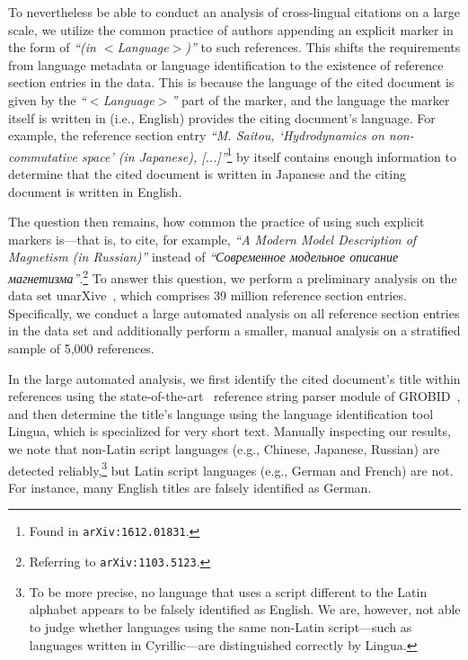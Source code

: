 To nevertheless be able to conduct an analysis of cross-lingual citations on a large scale, we utilize the common practice of authors appending an explicit marker in the form of \textit{``(in $<$Language$>$)''} to such references. This shifts the requirements from language metadata or language identification to the existence of reference section entries in the data. This is because the language of the cited document is given by the \textit{``$<$Language$>$''} part of the marker, and the language the marker itself is written in (i.e., English) provides the citing document's language. For example, the reference section entry \textit{``M. Saitou, `Hydrodynamics on non-commutative space' (in Japanese), [...]''}\footnote{Found in \texttt{arXiv:1612.01831}.} by itself contains enough information to determine that the cited document is written in Japanese and the citing document is written in English.

The question then remains, how common the practice of using such explicit markers is---that is, to cite, for example, \textit{``A Modern Model Description of Magnetism (in Russian)''} instead of \textit{``\foreignlanguage{russian}{Современное модельное описание магнетизма}''}.\footnote{Referring to \texttt{arXiv:1103.5123}.} To answer this question, we perform a preliminary analysis on the data set unarXive~\cite{Saier2020}, which comprises 39 million reference section entries. Specifically, we conduct a large automated analysis on all reference section entries in the data set and additionally perform a smaller, manual analysis on a stratified sample of 5,000 references.

In the large automated analysis, we first identify the cited document's title within references using the state-of-the-art~\cite{Tkaczyk2018} reference string parser module of GROBID~\cite{Lopez2009}, and then determine the title's language using the language identification tool Lingua, which is specialized for very short text.
Manually inspecting our results, we note that non-Latin script languages (e.g., Chinese, Japanese, Russian) are detected reliably,\footnote{To be more precise, no language that uses a script different to the Latin alphabet appears to be falsely identified as English. We are, however, not able to judge whether languages using the same non-Latin script---such as languages written in Cyrillic---are distinguished correctly by Lingua.} but Latin script languages (e.g., German and French) are not. For instance, many English titles are falsely identified as German.

